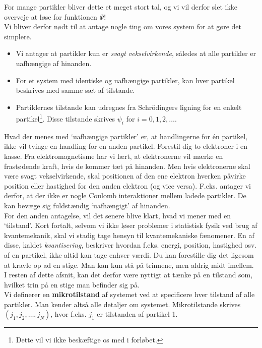For mange partikler bliver dette et meget stort tal, og vi vil derfor slet ikke overveje at løse for funktionen $\Psi$!\\ %
Vi bliver derfor nødt til at antage nogle ting om vores system for at gøre det simplere.
\begin{itemize}
    \item Vi antager at partikler kun er \emph{svagt vekselvirkende}, således at alle partikler er uafhængige af hinanden.
    \item For et system med identiske og uafhængige partikler, kan hver partikel beskrives med samme sæt af tilstande.
    \item Partiklernes tilstande kan udregnes fra Schrödingers ligning for en enkelt partikel\footnote{Dette vil vi ikke beskæftige os med i forløbet.}. Disse tilstande skrives $\psi_i$ for $i=0,1,2,\dots$.
\end{itemize}
Hvad der menes med `uafhængige partikler' er, at handlingerne for én partikel, ikke vil tvinge en handling for en anden partikel. Forestil dig to elektroner i en kasse. Fra elektromagnetisme har vi lært, at elektronerne vil mærke en frastødende kraft, hvis de kommer tæt på hinanden. Men hvis elektronerne skal være svagt vekselvirkende, skal positionen af den ene elektron hverken påvirke position eller hastighed for den anden elektron (og vice versa). F.eks. antager vi derfor, at der ikke er nogle Coulomb interaktioner mellem ladede partikler. De kan bevæge sig fuldstændig `uafhængigt' af hinanden.\\
For den anden antagelse, vil det senere blive klart, hvad vi mener med en `tilstand'. Kort fortalt, selvom vi ikke løser problemer i statistisk fysik ved brug af kvantemekanik, skal vi stadig tage hensyn til kvantemekaniske fænomener. En af disse, kaldet \emph{kvantisering}, beskriver hvordan f.eks. energi, position, hastighed osv. af en partikel, ikke altid kan tage enhver værdi. Du kan forestille dig det ligesom at kravle op ad en stige. Man kan kun stå på trinnene, men aldrig midt imellem. I resten af dette afsnit, kan det derfor være nyttigt at tænke på en tilstand som, hvilket trin på en stige man befinder sig på.\\[12pt]
Vi definerer en \textbf{mikrotilstand} af systemet ved at specificere hver tilstand af alle partikler. Man kender altså alle detaljer om systemet. Mikrotilstande skrives $(j_1,j_2,\dots,j_N)$, hvor f.eks. $j_1$ er tilstanden af partikel 1.\\

